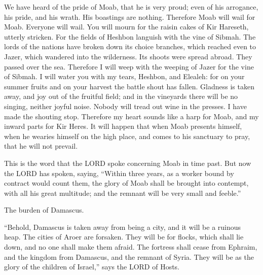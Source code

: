 \myverse{}We have heard of the pride of Moab, that he is very proud; even
of his arrogance, his pride, and his wrath. His boastings are nothing.
\myverse{}Therefore Moab will wail for Moab. Everyone will wail. You will mourn for the
raisin cakes of Kir Hareseth, utterly stricken.
\myverse{}For the fields of Heshbon languish with the vine of Sibmah. The lords of the
nations have broken down its choice branches, which reached even to Jazer, which wandered into the wilderness.
Its shoots were spread abroad. They passed over the sea.
\myverse{}Therefore I will weep with the weeping of Jazer for the vine of Sibmah. I will
water you with my tears, Heshbon, and Elealeh: for on your summer fruits and on your harvest the battle
shout has fallen.
\myverse{}Gladness is taken away, and joy out of the fruitful field; and in the vineyards
there will be no singing, neither joyful noise. Nobody will tread out wine in the presses. I have made
the shouting stop.
\myverse{}Therefore my heart sounds like a harp for Moab, and my inward parts for Kir
Heres.
\myverse{}It will happen that when Moab presents himself, when he wearies himself on
the high place, and comes to his sanctuary to pray, that he will not prevail.

\myverse{}This is the word that the LORD spoke concerning Moab in time
past.
\myverse{}But now the LORD has spoken, saying, “Within three years, as a worker bound
by contract would count them, the glory of Moab shall be brought into contempt, with all his great multitude;
and the remnant will be very small and feeble.”


\mychapter{} \myverse*{}The burden of Damascus.

\quad\quad “Behold, Damascus is taken away from being a city, and it will be a ruinous heap.
\myverse{}The cities of Aroer are forsaken. They will be for flocks, which shall lie
down, and no one shall make them afraid.
\myverse{}The fortress shall cease from Ephraim, and the kingdom from Damascus, and the
remnant of Syria. They will be as the glory of the children of Israel,” says the LORD of Hosts.

